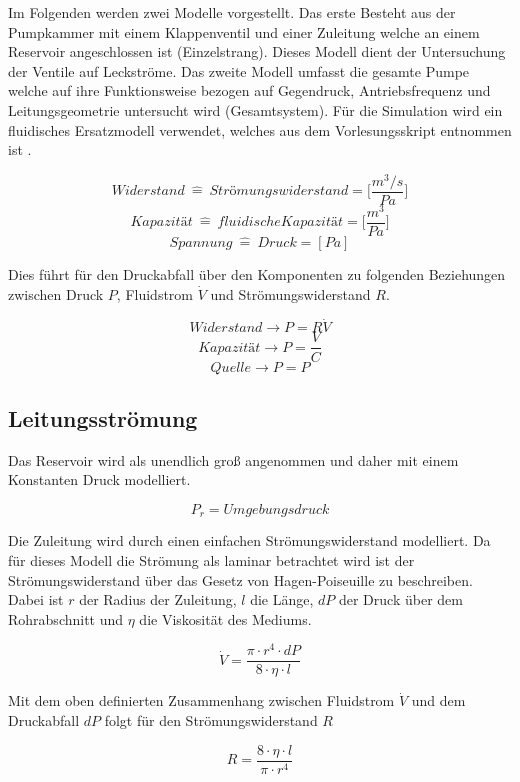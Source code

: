 \documentclass[fontsize=12pt, a4paper]{scrartcl}
\begin{document}
Im Folgenden werden zwei Modelle vorgestellt. Das erste Besteht aus der Pumpkammer mit einem Klappenventil und einer Zuleitung welche an einem Reservoir angeschlossen ist (Einzelstrang). Dieses Modell dient der Untersuchung der Ventile auf Leckströme. Das zweite Modell umfasst die gesamte Pumpe welche auf ihre Funktionsweise bezogen auf Gegendruck, Antriebsfrequenz und Leitungsgeometrie untersucht wird (Gesamtsystem). Für die Simulation wird ein fluidisches Ersatzmodell verwendet, welches aus dem Vorlesungsskript entnommen ist \cite{script}.

\[ Widerstand \:\widehat{=}\:  Strömungswiderstand = \biggl[\frac{m^3/s}{Pa}\biggr] \]
\[ Kapazität  \:\widehat{=}\:  fluidische Kapazität = \biggl[\frac{m^3}{Pa}\biggr] \]
\[ Spannung  \:\widehat{=}\:  Druck = [Pa] \]

Dies führt für den Druckabfall über den Komponenten zu folgenden Beziehungen zwischen Druck \(P\), Fluidstrom \(\dot{V}\) und Strömungswiderstand \(R\).

\[Widerstand \rightarrow P = R\dot{V} \]
\[Kapazität \rightarrow P = \frac{V}{C} \]
\[Quelle \rightarrow P = P \]

\subsection{Leitungsströmung}
\label{subsec:reservoirsection}
Das Reservoir wird als unendlich groß angenommen und daher mit einem Konstanten Druck modelliert.


\[ P_r = Umgebungsdruck \]

Die Zuleitung wird durch einen einfachen Strömungswiderstand modelliert. Da für dieses Modell die Strömung als laminar betrachtet wird ist der Strömungswiderstand über das Gesetz von Hagen-Poiseuille zu beschreiben. Dabei ist \( r \) der Radius der Zuleitung, \(l\) die Länge, \(dP\) der Druck über dem Rohrabschnitt und \(\eta\) die Viskosität des Mediums.

\begin{equation}
	\dot{V} = \frac{\pi \cdot r^4 \cdot dP}{8 \cdot \eta \cdot l}
	\label{eq:hagenpois}
\end{equation}

Mit dem oben definierten Zusammenhang zwischen Fluidstrom \(\dot{V}\) und dem Druckabfall \(dP\) folgt für den Strömungswiderstand \(R\)

\begin{equation}
	R = \frac{8 \cdot \eta \cdot l}{\pi \cdot r^4}
\label{eq:leckagestrom}
\end{equation}
\end{document}
